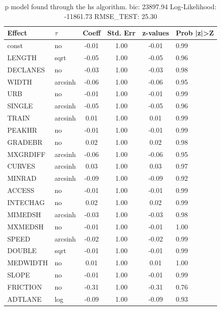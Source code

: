 \begin{table}
	\caption{p model found through the hs algorithm. bic: 23897.94 Log-Likelihood: -11861.73 RMSE_TEST: 25.30}
	\begin{center}
		\begin{tabular}{|l|l|c|c|c|l|}
			\hline
			Effect & $\tau$ & Coeff & Std. Err & z-values & Prob |z|>Z \\
			\hline
			const & no & -0.01 & 1.00 & -0.01 & 0.99 \\
			\hline
			LENGTH & sqrt & -0.05 & 1.00 & -0.05 & 0.96 \\
			\hline
			DECLANES & no & -0.03 & 1.00 & -0.03 & 0.98 \\
			\hline
			WIDTH & arcsinh & -0.06 & 1.00 & -0.06 & 0.95 \\
			\hline
			URB & no & -0.01 & 1.00 & -0.01 & 0.99 \\
			\hline
			SINGLE & arcsinh & -0.05 & 1.00 & -0.05 & 0.96 \\
			\hline
			TRAIN & arcsinh & 0.01 & 1.00 & 0.01 & 0.99 \\
			\hline
			PEAKHR & no & -0.01 & 1.00 & -0.01 & 0.99 \\
			\hline
			GRADEBR & no & 0.02 & 1.00 & 0.02 & 0.98 \\
			\hline
			MXGRDIFF & arcsinh & -0.06 & 1.00 & -0.06 & 0.95 \\
			\hline
			CURVES & arcsinh & 0.03 & 1.00 & 0.03 & 0.97 \\
			\hline
			MINRAD & arcsinh & -0.09 & 1.00 & -0.09 & 0.92 \\
			\hline
			ACCESS & no & -0.01 & 1.00 & -0.01 & 0.99 \\
			\hline
			INTECHAG & no & 0.02 & 1.00 & 0.02 & 0.99 \\
			\hline
			MIMEDSH & arcsinh & -0.03 & 1.00 & -0.03 & 0.98 \\
			\hline
			MXMEDSH & no & -0.01 & 1.00 & -0.01 & 1.00 \\
			\hline
			SPEED & arcsinh & -0.02 & 1.00 & -0.02 & 0.99 \\
			\hline
			DOUBLE & sqrt & -0.01 & 1.00 & -0.01 & 0.99 \\
			\hline
			MEDWIDTH & no & 0.01 & 1.00 & 0.01 & 1.00 \\
			\hline
			SLOPE & no & -0.01 & 1.00 & -0.01 & 0.99 \\
			\hline
			FRICTION & no & -0.31 & 1.00 & -0.31 & 0.76 \\
			\hline
			ADTLANE & log & -0.09 & 1.00 & -0.09 & 0.93 \\

\end{tabular}
\end{center}
\end{table}
